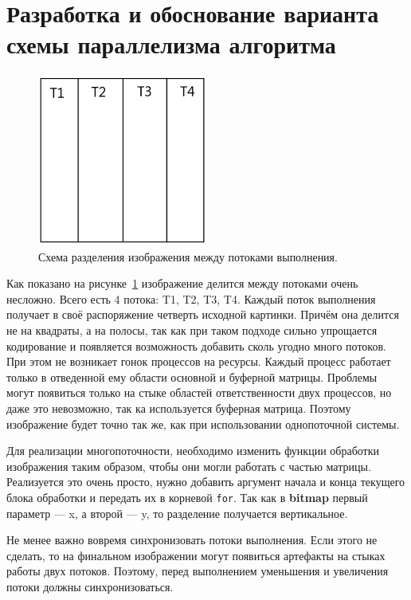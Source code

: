 \section{Разработка и обоснование варианта схемы параллелизма алгоритма}\label{sec:devAlgoParallel}
\begin{figure}[h]
    \begin{center}
        \includegraphics[width=0.5\textwidth]{../resources/img}
    \end{center}
    \caption{Схема разделения изображения между потоками выполнения.}
    \label{fig:imageThreads}
\end{figure}

Как показано на рисунке~\ref{fig:imageThreads} изображение делится между потоками очень несложно.
Всего есть 4 потока: T1, T2, T3, T4.
Каждый поток выполнения получает в своё распоряжение четверть исходной картинки.
Причём она делится не на квадраты, а на полосы, так как при таком подходе сильно упрощается кодирование и появляется возможность добавить сколь угодно много потоков.
При этом не возникает гонок процессов на ресурсы.
Каждый процесс работает только в отведенной ему области основной и буферной матрицы.
Проблемы могут появиться только на стыке областей ответственности двух процессов, но даже это невозможно, так ка используется буферная матрица.
Поэтому изображение будет точно так же, как при использовании однопоточной системы.

Для реализации многопоточности, необходимо изменить функции обработки изображения таким образом, чтобы они могли работать с частью матрицы.
Реализуется это очень просто, нужно добавить аргумент начала и конца текущего блока обработки и передать их в корневой \texttt{for}.
Так как в \textbf{bitmap} первый параметр --- x, а второй --- y, то разделение получается вертикальное.

Не менее важно вовремя синхронизовать потоки выполнения.
Если этого не сделать, то на финальном изображении могут появиться артефакты на стыках работы двух потоков.
Поэтому, перед выполнением уменьшения и увеличения потоки должны синхронизоваться.

